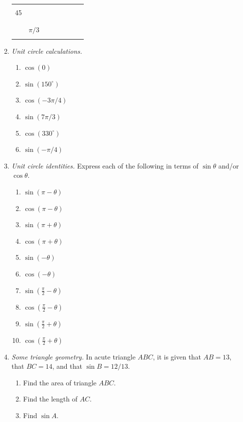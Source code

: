 \begin{enumerate}
\begin{center}
\begin{tabular}{c|c||c|c|c|c|c|c}
 & & & & & & & \\ \hline
 & & & & & & & \\
45 & & & & & & & \\
 & & & & & & & \\ \hline
 & & & & & & & \\
 & $\pi/3$ & & & & & & \\
 & & & & & & & 
\end{tabular}
\end{center}\newpage
\item \emph{Unit circle calculations.}
\begin{enumerate}
\item $\cos(0)$
\item $\sin(150^{\circ})$
\item $\cos(-3\pi/4)$
\item $\sin(7\pi/3)$
\item $\cos(330^{\circ})$
\item $\sin(-\pi/4)$
\end{enumerate}
\item \emph{Unit circle identities.} Express each of the following in terms of $\sin\theta$ and/or $\cos\theta$.
\begin{enumerate}
\item $\sin(\pi - \theta)$
\item $\cos(\pi - \theta)$
\item $\sin(\pi + \theta)$
\item $\cos(\pi + \theta)$
\item $\sin(-\theta)$
\item $\cos(-\theta)$
\item $\sin(\frac{\pi}{2} - \theta)$
\item $\cos(\frac{\pi}{2} - \theta)$
\item $\sin(\frac{\pi}{2} + \theta)$
\item $\cos(\frac{\pi}{2} + \theta)$
\end{enumerate}
\item \emph{Some triangle geometry.} In acute triangle $ABC$, it is given that $AB = 13$, that $BC = 14$, and that $\sin B = 12/13$.
\begin{enumerate}
\item Find the area of triangle $ABC$.
\item Find the length of $AC$.
\item Find $\sin A$.
\end{enumerate}
\end{enumerate}



